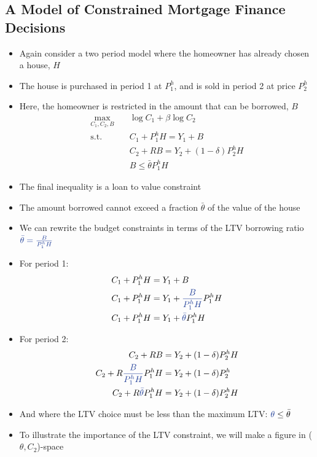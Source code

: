 \documentclass[a4paper,twoside]{article}
\numberwithin{equation}{section}
\numberwithin{figure}{section}
\begin{document}
\subsection{A Model of Constrained Mortgage Finance Decisions}
	\begin{itemize}
		\item Again consider a two period model where the homeowner has already chosen a house, \( H \)
		\item The house is purchased in period 1 at \( P_1^h \), and is sold in period 2 at price \( P_2^h \)
		\item Here, the homeowner is restricted in the amount that can be borrowed, \( B \)
		\begin{align*}
			\max_{C_1,C_2,B}\quad &\log C_1 + \beta\log C_2\\
			\text{s.t.}\quad &C_1+P_1^h H = Y_1 + B\\
			&C_2 + RB = Y_2 + (1-\delta) P_2^h H\\
			&B \leq \bar{\theta}P_1^h H
		\end{align*}
		\item The final inequality is a \textcolor{myblue}{loan to value constraint}
		\item The amount borrowed cannot exceed a fraction \( \bar{\theta} \) of the value of the house
		\item We can rewrite the budget constraints in terms of the LTV borrowing ratio \( \textcolor{myblue}{\bar{\theta} =\frac{B}{P_1^h H}} \)
		\item For period 1:
		\begin{align*}
			C_1+P_1^h H &= Y_1 + B\\
			C_1+P_1^h H &= Y_1 + \textcolor{myblue}{\frac{B}{P_1^h H}} P_1^h H\\
			C_1+P_1^h H &= Y_1 + \textcolor{myblue}{\bar{\theta}} P_1^h H
		\end{align*}
		\item For period 2:
		\begin{align*}
			C_2 + RB &= Y_2 + (1-\delta) P_2^h H\\
			C_2 + R\textcolor{myblue}{\frac{B}{P_1^h H}} P_1^h H &= Y_2 + (1-\delta) P_2^h \\
			C_2 + R\textcolor{myblue}{\bar{\theta}} P_1^h H &= Y_2 + (1-\delta) P_2^h H
		\end{align*}
		\item And where the LTV choice must be less than the maximum LTV: \( \textcolor{myblue}{\theta} \leq \bar{\theta} \)
		\item To illustrate the importance of the LTV constraint, we will make a figure in (\( \theta,C_2 \))-space

\end{itemize}
\end{document}
